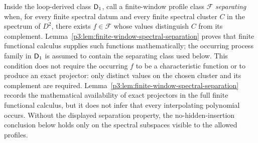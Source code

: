 \documentclass[12pt,a4paper]{article}
\begin{document}
\begin{definition}
\label{p3:def:finite-window-separating-profile}
Inside the loop-derived class \(\mathsf{D}_1\), call a finite-window profile class
\(\mathcal F\) \emph{separating} when, for every finite spectral datum and
every finite spectral cluster \(C\) in the spectrum of \(D^2\), there exists
\(f\in\mathcal F\) whose values distinguish \(C\) from its complement.
Lemma~\ref{p3:lem:finite-window-spectral-separation} proves that finite
functional calculus supplies such functions mathematically; the
occurring process family in \(\mathsf{D}_1\) is assumed to contain the separating
class used below.
This condition does not require the occurring \(f\) to be a characteristic
function or to produce an exact projector: only distinct values on the chosen
cluster and its complement are required.  Lemma~\ref{p3:lem:finite-window-spectral-separation}
records the mathematical availability of exact projectors in the full finite
functional calculus, but it does not infer that every interpolating polynomial
occurs.  Without the displayed separation property, the no-hidden-insertion
conclusion below holds only on the spectral subspaces visible to the allowed
profiles.
\end{definition}
\end{document}
